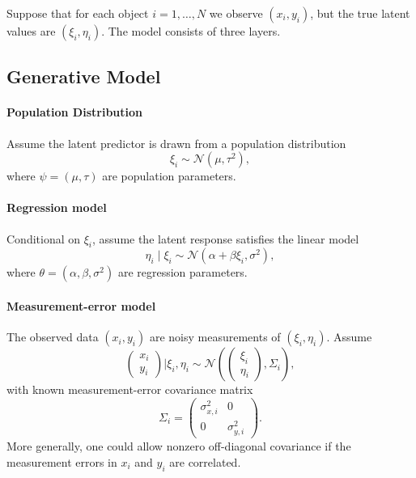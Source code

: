 \documentclass[11pt, titlepage]{article} %
\numberwithin{equation}{section}
\theoremstyle{definition}
\numberwithin{assumption}{section}
\begin{document}
Suppose that for each object $i=1,\dots,N$ we observe $(x_i,y_i)$, but the true latent values are $(\xi_i,\eta_i)$. The model consists of three layers.

\subsection{Generative Model}

\paragraph{Population Distribution}

Assume the latent predictor is drawn from a population distribution
\begin{equation*}
    \xi_i \sim \mathcal{N}(\mu,\tau^2),
\end{equation*}
where
$\psi=(\mu,\tau)$ are population parameters.

\paragraph{Regression model}

Conditional on $\xi_i$, assume the latent response satisfies the linear model
\begin{equation*}
    \eta_i \mid \xi_i \sim \mathcal{N}(\alpha+\beta \xi_i,\sigma^2),
\end{equation*}
where
$\theta=(\alpha,\beta,\sigma^2)$
are regression parameters.

\paragraph{Measurement-error model}

The observed data $(x_i,y_i)$ are noisy measurements of $(\xi_i,\eta_i)$. Assume
\begin{equation*}
    \begin{pmatrix}
        x_i\\
        y_i
    \end{pmatrix}
    \Bigg| \xi_i,\eta_i
    \sim
    \mathcal{N}\!\left(
    \begin{pmatrix}
        \xi_i\\
        \eta_i
    \end{pmatrix},
    \Sigma_i
    \right),
\end{equation*}
with known measurement-error covariance matrix
\begin{equation*}
    \Sigma_i=
    \begin{pmatrix}
        \sigma_{x,i}^2 & 0\\
        0 & \sigma_{y,i}^2
    \end{pmatrix}.
\end{equation*}
More generally, one could allow nonzero off-diagonal covariance if the measurement errors in $x_i$ and $y_i$ are correlated.
\end{document}
